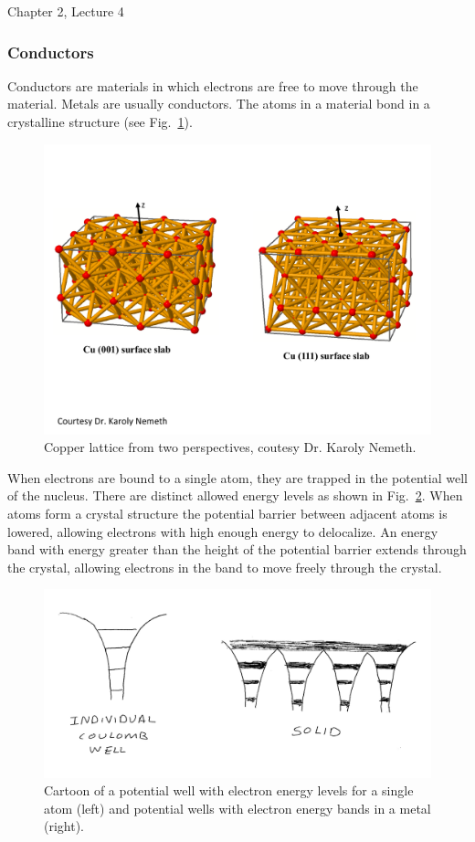 \documentclass[12pt]{article}
\begin{document}
\begin{flushright} {\color{blue} Chapter 2, Lecture 4} \end{flushright}
\begin{flushleft}

\subsubsection*{\bf Conductors}

Conductors are materials in which electrons are free to move through the material.  Metals are usually conductors.  The atoms in a material bond in a crystalline structure (see Fig.~\ref{fig:culattice}).  

\begin{figure}[h]
\centering
\includegraphics*[trim=0cm 4cm 1cm 2cm, clip=true, width=0.6\columnwidth]{Cu_lattice.pdf}
\caption{\small Copper lattice from two perspectives, coutesy Dr. Karoly Nemeth.}
\label{fig:culattice}
\end{figure}

When electrons are bound to a single atom, they are trapped in the potential well of the nucleus.  There are distinct allowed energy levels as shown in Fig.~\ref{fig:wells}.  When atoms form a crystal structure the potential barrier between adjacent atoms is lowered, allowing electrons with high enough energy to delocalize.  An energy band with energy greater than the height of the potential barrier extends through the crystal, allowing electrons in the band to move freely through the crystal. 

\begin{figure}[h]
\centering
\includegraphics*[trim=0cm 0cm 0cm 0cm, clip=true, width=0.6\columnwidth]{wells.png}
\caption{\small Cartoon of a potential well with electron energy levels for a single atom (left) and potential wells with electron energy bands in a metal (right).}
\label{fig:wells}
\end{figure}


\end{flushleft}
\end{document}
